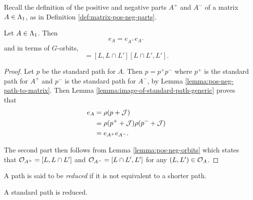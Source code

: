 \documentclass[a4paper, 11pt]{report}
\begin{document}
Recall the definition of the positive and negative parts $A^+$ and $A^-$ of a matrix $A\in\Lambda_1{}$, as in Definition \ref{def:matrix-pos-neg-parts}.

\begin{lemma}
Let $A\in\Lambda_1{}$. Then
\begin{equation*}
e_A = e_{A^+}e_{A^-}
\end{equation*}
and in terms of $G$-orbits,
\begin{equation*}
[L,L']=[L,L\cap L'][L\cap L',L'].
\end{equation*}
\end{lemma}

\begin{proof}
Let $p$ be the standard path for $A$. Then $p=p^+ p^-$ where $p^+$ is the standard path for $A^+$ and $p^-$ is the standard path for $A^-$, by Lemma \ref{lemma:pos-neg-path-to-matrix}. Then Lemma \ref{lemma:image-of-standard-path-generic} proves that
\begin{align*}
e_A
&= \rho(p+\mathcal{J})\\
&= \rho(p^+ +\mathcal{J})\rho(p^- +\mathcal{J})\\
&= e_{A^+}e_{A^-}.
\end{align*}

The second part then follows from Lemma \ref{lemma:pos-neg-orbits} which states that $\mathcal{O}_{A^+}=[L,L\cap L']$ and $\mathcal{O}_{A^-}=[L\cap L',L']$ for any $(L,L')\in\mathcal{O}_{A}$.
\end{proof}

\begin{definition}\label{def:reduced-path}
A path is said to be \emph{reduced} if it is not equivalent to a shorter path.
\end{definition}

\begin{lemma}\label{lemma:standard-path-reduced}
A standard path is reduced.
\end{lemma}
\end{document}
